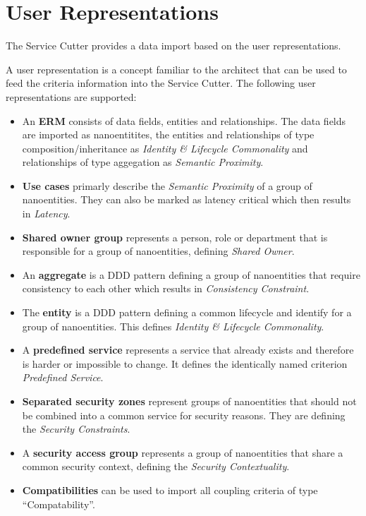 \section{User Representations}
\label{sec:dataImport}

The Service Cutter provides a data import based on the user representations.

A user representation is a concept familiar to the architect that can be used to feed the criteria information into the Service Cutter. The following user representations are supported:

\begin{itemize}
\item An \textbf{\gls{ERM}} consists of data fields, entities and relationships. The data fields are imported as nanoentitites, the entities and relationships of type composition/inheritance as\textit{ Identity \& Lifecycle Commonality} and relationships of type aggegation as \textit{Semantic Proximity}.
\item \textbf{Use cases} primarly describe the \textit{Semantic Proximity} of a group of nanoentities. They can also be marked as latency critical which then results in \textit{Latency}.
\item \textbf{Shared owner group} represents a person, role or department that is responsible for a group of nanoentities, defining \textit{Shared Owner}.
\item An \textbf{aggregate} is a \gls{DDD} pattern defining a group of nanoentities that require consistency to each other which results in \textit{Consistency Constraint}. 
\item The \textbf{entity} is a \gls{DDD} pattern defining a common lifecycle and identify for a group of nanoentities. This defines \textit{Identity \& Lifecycle Commonality}.
\item A \textbf{predefined service} represents a service that already exists and therefore is harder or impossible to change. It defines the identically named criterion \textit{Predefined Service}.
\item \textbf{Separated security zones} represent groups of nanoentities that should not be combined into a common service for security reasons. They are defining the \textit{Security Constraints}.
\item A \textbf{security access group} represents a group of nanoentities that share a common security context, defining the \textit{Security Contextuality}.
\item \textbf{Compatibilities} can be used to import all coupling criteria of type \enquote{Compatability}.
\end{itemize}

